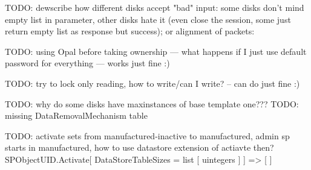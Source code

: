 TODO: dewscribe how different disks accept "bad" input: some disks don't mind empty list in parameter, other disks hate it (even close the session, some just return empty list  as response but success); or alignment of packets: 

TODO:  using Opal before taking ownership --- what happens if I just use default password for everything --- works just fine :)

TODO: try to lock only reading, how to write/can I write? -- can do just fine :)

TODO: why do some disks have maxinstances of base template one???
TODO: missing DataRemovalMechanism table



TODO: activate sets from manufactured-inactive to manufactured, admin sp starts in manufactured, how to use datastore extension of actiavte then?
SPObjectUID.Activate[
DataStoreTableSizes = list [ uintegers ]
]
=>
[ ]